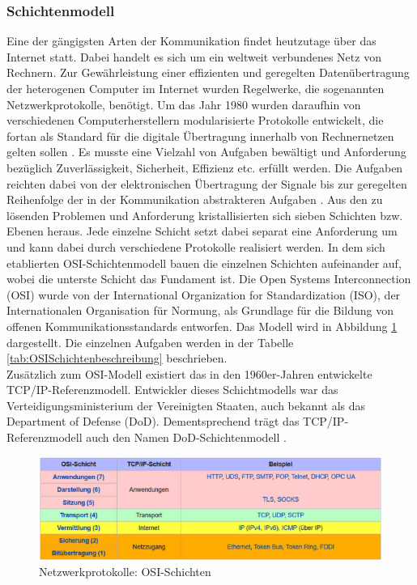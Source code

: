 \subsubsection{Schichtenmodell}
Eine der gängigsten Arten der Kommunikation findet heutzutage über das Internet statt. 
Dabei handelt es sich um ein weltweit verbundenes Netz von Rechnern. Zur Gewährleistung einer effizienten und geregelten Datenübertragung der heterogenen Computer im Internet wurden Regelwerke, die sogenannten Netzwerkprotokolle, benötigt.
Um das Jahr 1980 wurden daraufhin von verschiedenen Computerherstellern modularisierte Protokolle entwickelt, die fortan als Standard für die digitale Übertragung innerhalb von Rechnernetzen gelten sollen \cite{wikiNetzwerkprotokolle}.
Es musste eine Vielzahl von Aufgaben bewältigt und Anforderung bezüglich Zuverlässigkeit, Sicherheit, Effizienz etc. erfüllt werden. Die Aufgaben reichten dabei von der elektronischen Übertragung der Signale bis zur geregelten Reihenfolge der in der Kommunikation abstrakteren Aufgaben \cite{wikiOsiModell}.
Aus den zu lösenden Problemen und Anforderung kristallisierten sich sieben Schichten bzw. Ebenen heraus. 
Jede einzelne Schicht setzt dabei separat eine Anforderung um und kann dabei durch verschiedene Protokolle realisiert werden. In dem sich etablierten OSI-Schichtenmodell bauen die einzelnen Schichten aufeinander auf, wobei die unterste Schicht das Fundament ist. 
Die Open Systems Interconnection (OSI) wurde von der International Organization for Standardization (ISO), der Internationalen Organisation für Normung, als Grundlage für die Bildung von offenen Kommunikationsstandards entworfen. Das Modell wird in Abbildung \ref{fig:OSISchichten} dargestellt. Die einzelnen Aufgaben werden in der Tabelle \ref{tab:OSISchichtenbeschreibung} beschrieben.\\
\newline
\noindent
Zusätzlich zum OSI-Modell existiert das in den 1960er-Jahren entwickelte TCP/IP-Referenz\-modell. Entwickler dieses Schichtmodells war das Verteidigungsministerium der Vereinigten Staaten, auch bekannt als das Department of Defense (DoD). Dementsprechend trägt das TCP/IP-Referenzmodell auch den Namen DoD-Schichtenmodell \cite{wikiDodModell}.

\begin{figure}[tbt]
\centering
\includegraphics[width=\textwidth]{images/Netzwerkprotokolle_OSI-Schicht.PNG}
\caption[Netzwerkprotokolle: OSI-Schichten]{Netzwerkprotokolle: OSI-Schichten \protect \footnotemark}
\label{fig:OSISchichten}
\end{figure}

